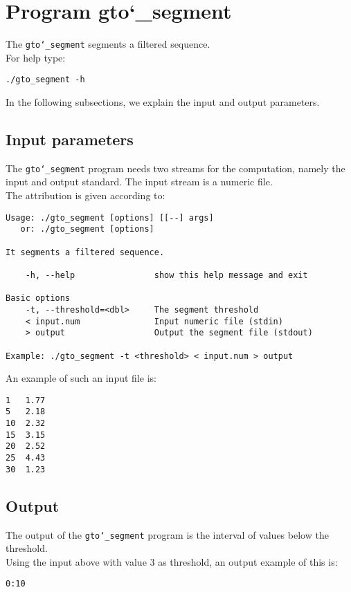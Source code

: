 \section{Program gto\char`_segment}
The \texttt{gto\char`_segment} segments a filtered sequence.\\
For help type:
\begin{lstlisting}
./gto_segment -h
\end{lstlisting}
In the following subsections, we explain the input and output parameters.

\subsection*{Input parameters}

The \texttt{gto\char`_segment} program needs two streams for the computation, namely the input and output standard. The input stream is a numeric file.\\
The attribution is given according to:
\begin{lstlisting}
Usage: ./gto_segment [options] [[--] args]
   or: ./gto_segment [options]

It segments a filtered sequence.

    -h, --help                show this help message and exit

Basic options
    -t, --threshold=<dbl>     The segment threshold
    < input.num               Input numeric file (stdin)
    > output                  Output the segment file (stdout)

Example: ./gto_segment -t <threshold> < input.num > output
\end{lstlisting}
An example of such an input file is:
\begin{lstlisting}
1   1.77
5   2.18
10  2.32
15  3.15
20  2.52
25  4.43
30  1.23
\end{lstlisting}

\subsection*{Output}
The output of the \texttt{gto\char`_segment} program is the interval of values ​​below the threshold.\\
Using the input above with value 3 as threshold, an output example of this is:
\begin{lstlisting}
0:10
\end{lstlisting}